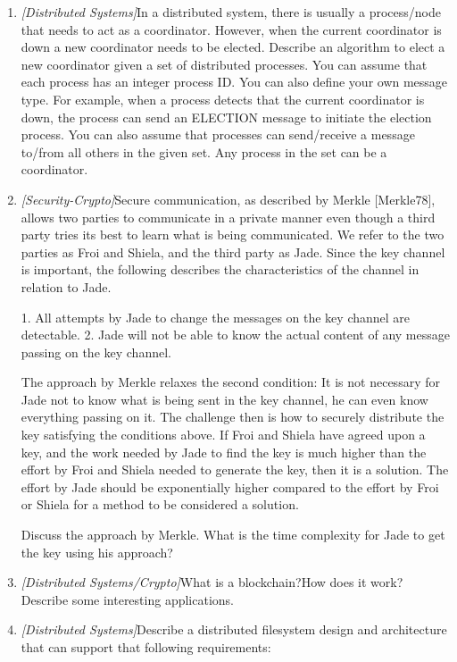 \documentclass{article}
\begin{document}
\begin{enumerate}
  	\item{\textit{[Distributed Systems]}In a distributed system, there is usually a process/node that needs to act as a coordinator. However, when the current coordinator is down a new coordinator needs to be elected. Describe an algorithm to elect a new coordinator given a set of distributed processes. You can assume that each process has an integer process ID. You can  also define your own message type. For example, when a process detects that the current coordinator is down, the process can send an ELECTION message to initiate the election process. You can also assume that processes can send/receive a message to/from all others in the given set. Any process in the set can be a coordinator.}
  	
	\item{\textit{[Security-Crypto]}Secure communication, as described by Merkle [Merkle78], allows two parties to communicate in a private manner even though a third party tries its best to learn what is being communicated. We refer to the two parties as Froi and Shiela, and the third party as Jade. Since the key channel is important, the following describes the characteristics of the channel in relation to Jade.

1. All attempts by Jade to change the messages on the key channel are detectable.
2. Jade will not be able to know the actual content of any message passing on the key channel.

The approach by Merkle relaxes the second condition: It is not necessary for Jade not to know what is being sent in the key channel, he can even know everything passing on it. The challenge then is how
to securely distribute the key satisfying the conditions above. If Froi and Shiela have agreed upon a key, and the work needed by Jade to find the key is much higher than the effort by Froi and Shiela needed
to generate the key, then it is a solution. The effort by Jade should be exponentially higher compared to the effort by Froi or Shiela for a method to be considered a solution.

Discuss the approach by Merkle. What is the time complexity for Jade to get the key using his approach?}  	

	\item{\textit{[Distributed Systems/Crypto]}What is a blockchain?How does it work? Describe some interesting applications.}
	
	\item{\textit{[Distributed Systems]}Describe a distributed filesystem design and architecture that can support that following requirements:

}
\end{enumerate}
\end{document}
